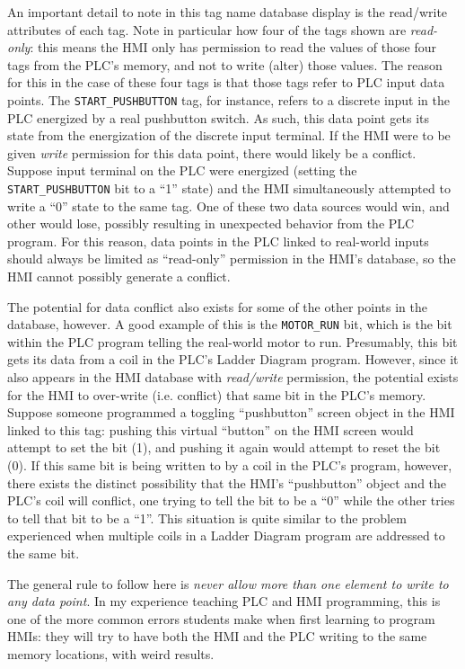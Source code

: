 An important detail to note in this tag name database display is the read/write attributes of each tag.  Note in particular how four of the tags shown are \textit{read-only}: this means the HMI only has permission to read the values of those four tags from the PLC's memory, and not to write (alter) those values.  The reason for this in the case of these four tags is that those tags refer to PLC input data points.  The \texttt{START\_PUSHBUTTON} tag, for instance, refers to a discrete input in the PLC energized by a real pushbutton switch.  As such, this data point gets its state from the energization of the discrete input terminal.  If the HMI were to be given \textit{write} permission for this data point, there would likely be a conflict.  Suppose input terminal on the PLC were energized (setting the \texttt{START\_PUSHBUTTON} bit to a ``1'' state) and the HMI simultaneously attempted to write a ``0'' state to the same tag.  One of these two data sources would win, and other would lose, possibly resulting in unexpected behavior from the PLC program.  For this reason, data points in the PLC linked to real-world inputs should always be limited as ``read-only'' permission in the HMI's database, so the HMI cannot possibly generate a conflict.

The potential for data conflict also exists for some of the other points in the database, however.  A good example of this is the \texttt{MOTOR\_RUN} bit, which is the bit within the PLC program telling the real-world motor to run.  Presumably, this bit gets its data from a coil in the PLC's Ladder Diagram program.  However, since it also appears in the HMI database with \textit{read/write} permission, the potential exists for the HMI to over-write (i.e. conflict) that same bit in the PLC's memory.  Suppose someone programmed a toggling ``pushbutton'' screen object in the HMI linked to this tag: pushing this virtual ``button'' on the HMI screen would attempt to set the bit (1), and pushing it again would attempt to reset the bit (0).  If this same bit is being written to by a coil in the PLC's program, however, there exists the distinct possibility that the HMI's ``pushbutton'' object and the PLC's coil will conflict, one trying to tell the bit to be a ``0'' while the other tries to tell that bit to be a ``1''.  This situation is quite similar to the problem experienced when multiple coils in a Ladder Diagram program are addressed to the same bit.

The general rule to follow here is \textit{never allow more than one element to write to any data point}.  In my experience teaching PLC and HMI programming, this is one of the more common errors students make when first learning to program HMIs: they will try to have both the HMI and the PLC writing to the same memory locations, with weird results.

